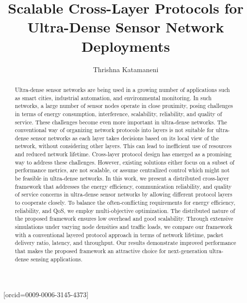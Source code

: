 \documentclass[a4paper,fleqn]{cas-dc}
\numberwithin{equation}{section}
\begin{document}
\let\WriteBookmarks\relax
\def\floatpagepagefraction{1}
\def\textpagefraction{.001}


\title [mode = title]{Scalable Cross-Layer Protocols for Ultra-Dense 
Sensor Network Deployments}                      


\author[1]{Thrishna Katamaneni}[orcid=0009-0006-3145-4373]
\address[1]{School of Computer Science and Engineering, VIT-AP University, Amaravathi. Andhra Pradesh, India}



\begin{abstract}
Ultra-dense sensor networks are being used in a growing number of applications such as smart cities, industrial automation, and environmental monitoring. In such networks, a large number of sensor nodes operate in close proximity, posing challenges in terms of energy consumption, interference, scalability, reliability, and quality of service. These challenges become even more important in ultra-dense networks. The conventional way of organizing network protocols into layers is not suitable for ultra-dense sensor networks as each layer takes decisions based on its local view of the network, without considering other layers. This can lead to inefficient use of resources and reduced network lifetime. Cross-layer protocol design has emerged as a promising way to address these challenges. However, existing solutions either focus on a subset of performance metrics, are not scalable, or assume centralized control which might not be feasible in ultra-dense networks. In this work, we present a distributed cross-layer framework that addresses the energy efficiency, communication reliability, and quality of service concerns in ultra-dense sensor networks by allowing different protocol layers to cooperate closely. To balance the often-conflicting requirements for energy efficiency, reliability, and QoS, we employ multi-objective optimization. The distributed nature of the proposed framework ensures low overhead and good scalability. Through extensive simulations under varying node densities and traffic loads, we compare our framework with a conventional layered protocol approach in terms of network lifetime, packet delivery ratio, latency, and throughput. Our results demonstrate improved performance that makes the proposed framework an attractive choice for next-generation ultra-dense sensing applications.
\end{abstract}
\end{document}
